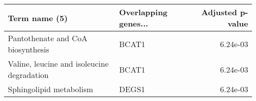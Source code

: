 \begin{tabular}{llr}
\toprule
                             Term name (5) & Overlapping genes... &  Adjusted p-value \\
\midrule
         Pantothenate and CoA biosynthesis &                BCAT1 &          6.24e-03 \\
Valine, leucine and isoleucine degradation &                BCAT1 &          6.24e-03 \\
                   Sphingolipid metabolism &                DEGS1 &          6.24e-03 \\
\bottomrule
\end{tabular}
